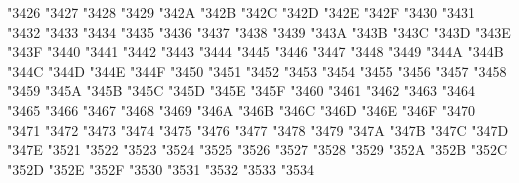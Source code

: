 {\Uchar\jis"3426 %
\Uchar\jis"3427 %
\Uchar\jis"3428 %
\Uchar\jis"3429 %
\Uchar\jis"342A %
\Uchar\jis"342B %
\Uchar\jis"342C %
\Uchar\jis"342D %
\Uchar\jis"342E %
\Uchar\jis"342F %
\Uchar\jis"3430 %
\Uchar\jis"3431 %
\Uchar\jis"3432 %
\Uchar\jis"3433 %
\Uchar\jis"3434 %
\Uchar\jis"3435 %
\Uchar\jis"3436 %
\Uchar\jis"3437 %
\Uchar\jis"3438 %
\Uchar\jis"3439 %
\Uchar\jis"343A %
\Uchar\jis"343B %
\Uchar\jis"343C %
\Uchar\jis"343D %
\Uchar\jis"343E %
\Uchar\jis"343F %
\Uchar\jis"3440 %
\Uchar\jis"3441 %
\Uchar\jis"3442 %
\Uchar\jis"3443 %
\Uchar\jis"3444 %
\Uchar\jis"3445 %
\Uchar\jis"3446 %
\Uchar\jis"3447 %
\Uchar\jis"3448 %
\Uchar\jis"3449 %
\Uchar\jis"344A %
\Uchar\jis"344B %
\Uchar\jis"344C %
\Uchar\jis"344D %
\Uchar\jis"344E %
\Uchar\jis"344F %
\Uchar\jis"3450 %
\Uchar\jis"3451 %
\Uchar\jis"3452 %
\Uchar\jis"3453 %
\Uchar\jis"3454 %
\Uchar\jis"3455 %
\Uchar\jis"3456 %
\Uchar\jis"3457 %
\Uchar\jis"3458 %
\Uchar\jis"3459 %
\Uchar\jis"345A %
\Uchar\jis"345B %
\Uchar\jis"345C %
\Uchar\jis"345D %
\Uchar\jis"345E %
\Uchar\jis"345F %
\Uchar\jis"3460 %
\Uchar\jis"3461 %
\Uchar\jis"3462 %
\Uchar\jis"3463 %
\Uchar\jis"3464 %
\Uchar\jis"3465 %
\Uchar\jis"3466 %
\Uchar\jis"3467 %
\Uchar\jis"3468 %
\Uchar\jis"3469 %
\Uchar\jis"346A %
\Uchar\jis"346B %
\Uchar\jis"346C %
\Uchar\jis"346D %
\Uchar\jis"346E %
\Uchar\jis"346F %
\Uchar\jis"3470 %
\Uchar\jis"3471 %
\Uchar\jis"3472 %
\Uchar\jis"3473 %
\Uchar\jis"3474 %
\Uchar\jis"3475 %
\Uchar\jis"3476 %
\Uchar\jis"3477 %
\Uchar\jis"3478 %
\Uchar\jis"3479 %
\Uchar\jis"347A %
\Uchar\jis"347B %
\Uchar\jis"347C %
\Uchar\jis"347D %
\Uchar\jis"347E %
\Uchar\jis"3521 %
\Uchar\jis"3522 %
\Uchar\jis"3523 %
\Uchar\jis"3524 %
\Uchar\jis"3525 %
\Uchar\jis"3526 %
\Uchar\jis"3527 %
\Uchar\jis"3528 %
\Uchar\jis"3529 %
\Uchar\jis"352A %
\Uchar\jis"352B %
\Uchar\jis"352C %
\Uchar\jis"352D %
\Uchar\jis"352E %
\Uchar\jis"352F %
\Uchar\jis"3530 %
\Uchar\jis"3531 %
\Uchar\jis"3532 %
\Uchar\jis"3533 %
\Uchar\jis"3534 %
}
